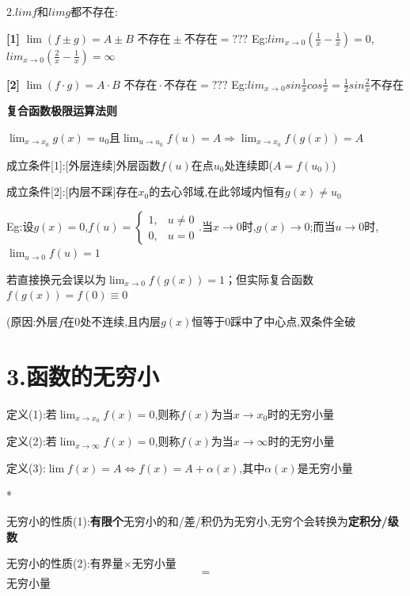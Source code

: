 \documentclass[11pt,a4paper,UTF8]{ctexart}
\begin{document}
2.$limf$和$limg$都不存在:

\begin{solbox}[{分步推导与答题规范}]
\textbf{[1]} $\lim(f \pm g) = A \pm B$ $\text{不存在}\pm \text{不存在}=???$      Eg:$lim_{x\rightarrow 0}(\frac{1}{x}-\frac{1}{x})=0$,$lim_{x\rightarrow 0}(\frac{2}{x}-\frac{1}{x})=\infty$

\textbf{[2]} $\lim(f \cdot g) = A \cdot B$	$\text{不存在}\cdot \text{不存在}=???$	 Eg:$lim_{x\rightarrow 0}sin\frac{1}{x}cos\frac{1}{x}=\frac{1}{2}sin\frac{2}{x}\text{不存在}$
\end{solbox}

\textbf{复合函数极限运算法则}

$\lim_{x \to x_0} g(x) = u_0$且$\lim_{u \to u_0} f(u) = A\Rightarrow\lim_{x \to x_0} f(g(x)) = A$

\begin{solbox}[{分步推导与答题规范}]
  成立条件[1]:[外层连续]外层函数$f(u)$在点$u_0$处连续即($A = f(u_0)$)

  成立条件[2]:[内层不踩]存在$x_0$的去心邻域,在此邻域内恒有$g(x) \neq u_0$
\end{solbox}

Eg:设$g(x) = 0$,$f(u) = \begin{cases} 1, & u \neq 0 \\ 0, & u = 0 \end{cases}$.当$x \to 0$时,$g(x) \to 0$;而当$u \to 0$时,$\lim_{u \to 0} f(u) = 1$

若直接换元会误以为$\lim_{x \to 0} f(g(x)) = 1$；但实际复合函数$f(g(x)) = f(0) \equiv 0$

(原因:外层$f$在0处不连续,且内层$g(x)$恒等于0踩中了中心点,双条件全破


\section{3.函数的无穷小}

定义(1):若$\lim_{x \to x_0} f(x) = 0$,则称$f(x)$为当$x \to x_0$时的无穷小量

定义(2):若$\lim_{x \to \infty} f(x) = 0$,则称$f(x)$为当$x \to \infty$时的无穷小量

定义(3):$\lim f(x) = A \iff f(x) = A + \alpha(x)$,其中$\alpha(x)$是无穷小量

\textit{}*

无穷小的性质(1):\textbf{有限个}无穷小的和/差/积仍为无穷小,无穷个会转换为\textbf{定积分/级数}

无穷小的性质(2):有界量$\times$无穷小量
\begin{equation*}
=
\end{equation*}
无穷小量
\end{document}
